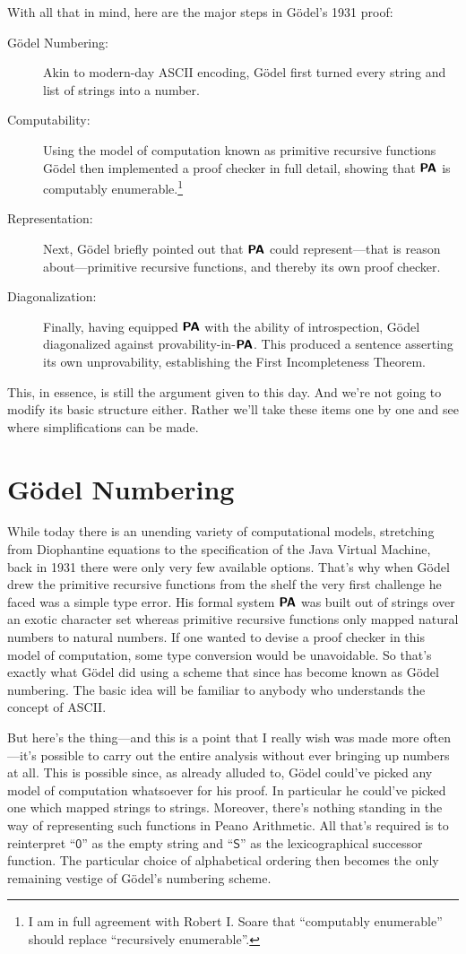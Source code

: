 \documentclass{article}
\theoremstyle{customstyle}
\newcommand{\qu}[1]{\mathsf{#1}}
\newcommand{\PA}{\textbf{\textsf{PA}}}
\begin{document}
With all that in mind, here are the major steps in Gödel's 1931 proof:
\begin{description}
  \item[Gödel Numbering:] Akin to modern-day ASCII encoding, Gödel first turned every string and list of strings into a number.
  \item[Computability:] Using the model of computation known as primitive recursive functions Gödel then implemented a proof checker in full detail, showing that $\PA$ is computably enumerable.\footnote{I am in full agreement with Robert I. Soare that ``computably enumerable'' should replace ``recursively enumerable''.}
  \item[Representation:] Next, Gödel briefly pointed out that $\PA$ could represent---that is reason about---primitive recursive functions, and thereby its own proof checker.
  \item[Diagonalization:] Finally, having equipped $\PA$ with the ability of introspection, Gödel diagonalized against provability-in-$\PA$. This produced a sentence asserting its own unprovability, establishing the First Incompleteness Theorem.
\end{description}

This, in essence, is still the argument given to this day. And we're not going to modify its basic structure either. Rather we'll take these items one by one and see where simplifications can be made.

\section{Gödel Numbering}

While today there is an unending variety of computational models, stretching from Diophantine equations to the specification of the Java Virtual Machine, back in 1931 there were only very few available options. That's why when Gödel drew the primitive recursive functions from the shelf the very first challenge he faced was a simple type error. His formal system $\PA$ was built out of strings over an exotic character set whereas primitive recursive functions only mapped natural numbers to natural numbers. If one wanted to devise a proof checker in this model of computation, some type conversion would be unavoidable. So that's exactly what Gödel did using a scheme that since has become known as Gödel numbering. The basic idea will be familiar to anybody who understands the concept of ASCII.

But here's the thing---and this is a point that I really wish was made more often---it's possible to carry out the entire analysis without ever bringing up numbers at all. This is possible since, as already alluded to, Gödel could've picked any model of computation whatsoever for his proof. In particular he could've picked one which mapped strings to strings. Moreover, there's nothing standing in the way of representing such functions in Peano Arithmetic. All that's required is to reinterpret ``$\qu{0}$'' as the empty string and ``$\qu{S}$'' as the lexicographical successor function. The particular choice of alphabetical ordering then becomes the only remaining vestige of Gödel's numbering scheme.
\end{document}
